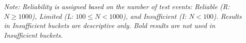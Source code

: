 \begin{tableorg}[htbp]
{\begin{tabular}{lllcrccccc}
\end{tabular}
}

\vspace{1ex}
\noindent\footnotesize \textit{Note: Reliability is assigned based on the number of test events: Reliable (R: $N \ge 1000$), Limited (L: $100 \le N < 1000$), and Insufficient (I: $N < 100$). Results in Insufficient buckets are descriptive only. Bold results are not used in Insufficient buckets.}


\end{tableorg}

